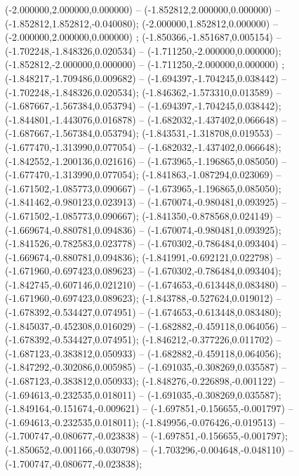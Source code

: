  (-2.000000,2.000000,0.000000) -- (-1.852812,2.000000,0.000000) -- (-1.852812,1.852812,-0.040080);
 (-2.000000,1.852812,0.000000) -- (-2.000000,2.000000,0.000000) ;
 (-1.850366,-1.851687,0.005154) -- (-1.702248,-1.848326,0.020534) -- (-1.711250,-2.000000,0.000000);
 (-1.852812,-2.000000,0.000000) -- (-1.711250,-2.000000,0.000000) ;
 (-1.848217,-1.709486,0.009682) -- (-1.694397,-1.704245,0.038442) -- (-1.702248,-1.848326,0.020534);
 (-1.846362,-1.573310,0.013589) -- (-1.687667,-1.567384,0.053794) -- (-1.694397,-1.704245,0.038442);
 (-1.844801,-1.443076,0.016878) -- (-1.682032,-1.437402,0.066648) -- (-1.687667,-1.567384,0.053794);
 (-1.843531,-1.318708,0.019553) -- (-1.677470,-1.313990,0.077054) -- (-1.682032,-1.437402,0.066648);
 (-1.842552,-1.200136,0.021616) -- (-1.673965,-1.196865,0.085050) -- (-1.677470,-1.313990,0.077054);
 (-1.841863,-1.087294,0.023069) -- (-1.671502,-1.085773,0.090667) -- (-1.673965,-1.196865,0.085050);
 (-1.841462,-0.980123,0.023913) -- (-1.670074,-0.980481,0.093925) -- (-1.671502,-1.085773,0.090667);
 (-1.841350,-0.878568,0.024149) -- (-1.669674,-0.880781,0.094836) -- (-1.670074,-0.980481,0.093925);
 (-1.841526,-0.782583,0.023778) -- (-1.670302,-0.786484,0.093404) -- (-1.669674,-0.880781,0.094836);
 (-1.841991,-0.692121,0.022798) -- (-1.671960,-0.697423,0.089623) -- (-1.670302,-0.786484,0.093404);
 (-1.842745,-0.607146,0.021210) -- (-1.674653,-0.613448,0.083480) -- (-1.671960,-0.697423,0.089623);
 (-1.843788,-0.527624,0.019012) -- (-1.678392,-0.534427,0.074951) -- (-1.674653,-0.613448,0.083480);
 (-1.845037,-0.452308,0.016029) -- (-1.682882,-0.459118,0.064056) -- (-1.678392,-0.534427,0.074951);
 (-1.846212,-0.377226,0.011702) -- (-1.687123,-0.383812,0.050933) -- (-1.682882,-0.459118,0.064056);
 (-1.847292,-0.302086,0.005985) -- (-1.691035,-0.308269,0.035587) -- (-1.687123,-0.383812,0.050933);
 (-1.848276,-0.226898,-0.001122) -- (-1.694613,-0.232535,0.018011) -- (-1.691035,-0.308269,0.035587);
 (-1.849164,-0.151674,-0.009621) -- (-1.697851,-0.156655,-0.001797) -- (-1.694613,-0.232535,0.018011);
 (-1.849956,-0.076426,-0.019513) -- (-1.700747,-0.080677,-0.023838) -- (-1.697851,-0.156655,-0.001797);
 (-1.850652,-0.001166,-0.030798) -- (-1.703296,-0.004648,-0.048110) -- (-1.700747,-0.080677,-0.023838);
